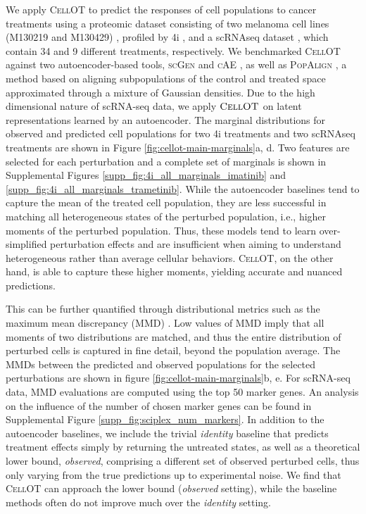 We apply \textsc{CellOT} to predict the responses of cell populations to cancer treatments using a proteomic dataset consisting of two melanoma cell lines (M130219 and M130429) \cite{raaijmakers2015}, profiled by 4i \cite{gut2018}, and a scRNAseq dataset \cite{srivatsan2020}, which contain 34 and 9 different treatments, respectively.
We benchmarked \textsc{CellOT} against two autoencoder-based tools, \textsc{scGen} \cite{lotfollahi2019} and \textsc{cAE} \cite{lopez2018}, as well as \textsc{PopAlign} \cite{chen2020}, a method based on aligning subpopulations of the control and treated space approximated through a mixture of Gaussian densities.
Due to the high dimensional nature of scRNA-seq data, we apply $\textsc{CellOT}$ on latent representations learned by an autoencoder.
The marginal distributions for observed and predicted cell populations for two 4i treatments and two scRNAseq treatments are shown in Figure \ref{fig:cellot-main-marginals}a, d.
Two features are selected for each perturbation and a complete set of marginals is shown in Supplemental Figures \ref{supp_fig:4i_all_marginals_imatinib} and \ref{supp_fig:4i_all_marginals_trametinib}.
While the autoencoder baselines tend to capture the mean of the treated cell population, they are less successful in matching all heterogeneous states of the perturbed population, i.e., higher moments of the perturbed population.
Thus, these models tend to learn over-simplified perturbation effects and are insufficient when aiming to understand heterogeneous rather than average cellular behaviors.
\textsc{CellOT}, on the other hand, is able to capture these higher moments, yielding accurate and nuanced predictions.

This can be further quantified through distributional metrics such as the maximum mean discrepancy (MMD) \cite{gretton2012}.
Low values of MMD imply that all moments of two distributions are matched, and thus the entire distribution of perturbed cells is captured in fine detail, beyond the population average.
The MMDs between the predicted and observed populations for the selected perturbations are shown in figure \ref{fig:cellot-main-marginals}b, e.
For scRNA-seq data, MMD evaluations are computed using the top 50 marker genes. An analysis on the influence of the number of chosen marker genes can be found in Supplemental Figure \ref{supp_fig:sciplex_num_markers}.
In addition to the autoencoder baselines, we include the trivial \emph{identity} baseline that predicts treatment effects simply by returning the untreated states,
as well as a theoretical lower bound, \emph{observed}, comprising a different set of observed perturbed cells, thus only varying from the true predictions up to experimental noise.
We find that \textsc{CellOT} can approach the lower bound (\emph{observed} setting), while the baseline methods often do not improve much over the \emph{identity} setting.

